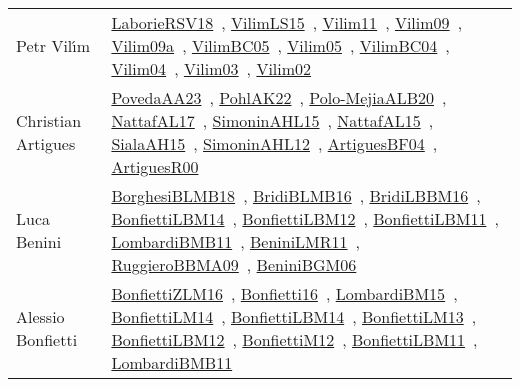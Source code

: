 {\begin{longtable}{p{4cm}p{20cm}}
Petr Vil{\'{\i}}m & \href{works/LaborieRSV18.pdf}{LaborieRSV18}~\cite{LaborieRSV18}, \href{works/VilimLS15.pdf}{VilimLS15}~\cite{VilimLS15}, \href{works/Vilim11.pdf}{Vilim11}~\cite{Vilim11}, \href{works/Vilim09.pdf}{Vilim09}~\cite{Vilim09}, \href{works/Vilim09a.pdf}{Vilim09a}~\cite{Vilim09a}, \href{works/VilimBC05.pdf}{VilimBC05}~\cite{VilimBC05}, \href{works/Vilim05.pdf}{Vilim05}~\cite{Vilim05}, \href{works/VilimBC04.pdf}{VilimBC04}~\cite{VilimBC04}, \href{works/Vilim04.pdf}{Vilim04}~\cite{Vilim04}, \href{works/Vilim03.pdf}{Vilim03}~\cite{Vilim03}, \href{works/Vilim02.pdf}{Vilim02}~\cite{Vilim02}\\
Christian Artigues & \href{works/PovedaAA23.pdf}{PovedaAA23}~\cite{PovedaAA23}, \href{works/PohlAK22.pdf}{PohlAK22}~\cite{PohlAK22}, \href{works/Polo-MejiaALB20.pdf}{Polo-MejiaALB20}~\cite{Polo-MejiaALB20}, \href{works/NattafAL17.pdf}{NattafAL17}~\cite{NattafAL17}, \href{works/SimoninAHL15.pdf}{SimoninAHL15}~\cite{SimoninAHL15}, \href{works/NattafAL15.pdf}{NattafAL15}~\cite{NattafAL15}, \href{works/SialaAH15.pdf}{SialaAH15}~\cite{SialaAH15}, \href{works/SimoninAHL12.pdf}{SimoninAHL12}~\cite{SimoninAHL12}, \href{works/ArtiguesBF04.pdf}{ArtiguesBF04}~\cite{ArtiguesBF04}, \href{works/ArtiguesR00.pdf}{ArtiguesR00}~\cite{ArtiguesR00}\\
Luca Benini & \href{works/BorghesiBLMB18.pdf}{BorghesiBLMB18}~\cite{BorghesiBLMB18}, \href{works/BridiBLMB16.pdf}{BridiBLMB16}~\cite{BridiBLMB16}, \href{works/BridiLBBM16.pdf}{BridiLBBM16}~\cite{BridiLBBM16}, \href{works/BonfiettiLBM14.pdf}{BonfiettiLBM14}~\cite{BonfiettiLBM14}, \href{works/BonfiettiLBM12.pdf}{BonfiettiLBM12}~\cite{BonfiettiLBM12}, \href{works/BonfiettiLBM11.pdf}{BonfiettiLBM11}~\cite{BonfiettiLBM11}, \href{works/LombardiBMB11.pdf}{LombardiBMB11}~\cite{LombardiBMB11}, \href{works/BeniniLMR11.pdf}{BeniniLMR11}~\cite{BeniniLMR11}, \href{works/RuggieroBBMA09.pdf}{RuggieroBBMA09}~\cite{RuggieroBBMA09}, \href{works/BeniniBGM06.pdf}{BeniniBGM06}~\cite{BeniniBGM06}\\
Alessio Bonfietti & \href{works/BonfiettiZLM16.pdf}{BonfiettiZLM16}~\cite{BonfiettiZLM16}, \href{works/Bonfietti16.pdf}{Bonfietti16}~\cite{Bonfietti16}, \href{works/LombardiBM15.pdf}{LombardiBM15}~\cite{LombardiBM15}, \href{works/BonfiettiLM14.pdf}{BonfiettiLM14}~\cite{BonfiettiLM14}, \href{works/BonfiettiLBM14.pdf}{BonfiettiLBM14}~\cite{BonfiettiLBM14}, \href{works/BonfiettiLM13.pdf}{BonfiettiLM13}~\cite{BonfiettiLM13}, \href{works/BonfiettiLBM12.pdf}{BonfiettiLBM12}~\cite{BonfiettiLBM12}, \href{works/BonfiettiM12.pdf}{BonfiettiM12}~\cite{BonfiettiM12}, \href{works/BonfiettiLBM11.pdf}{BonfiettiLBM11}~\cite{BonfiettiLBM11}, \href{works/LombardiBMB11.pdf}{LombardiBMB11}~\cite{LombardiBMB11}\\

\end{longtable}}
